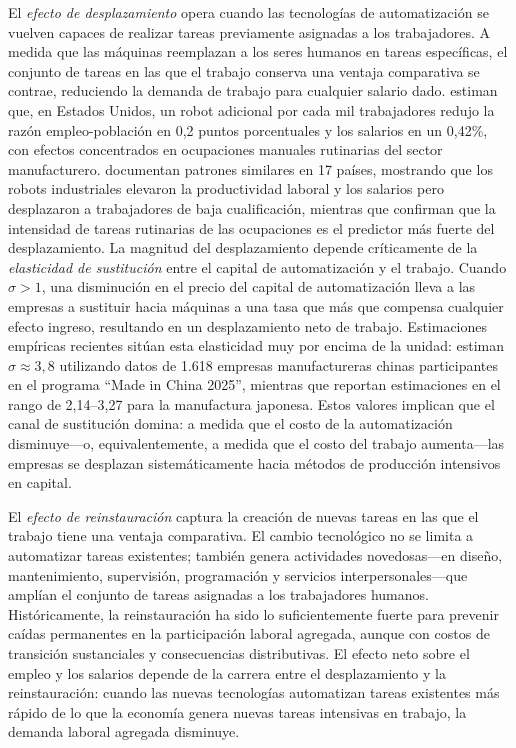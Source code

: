 \documentclass{article}
\begin{document}
El \textit{efecto de desplazamiento} opera cuando las tecnolog\'ias de automatizaci\'on se vuelven capaces de realizar tareas previamente asignadas a los trabajadores. A medida que las m\'aquinas reemplazan a los seres humanos en tareas espec\'ificas, el conjunto de tareas en las que el trabajo conserva una ventaja comparativa se contrae, reduciendo la demanda de trabajo para cualquier salario dado. \cite{acemoglu2020robots} estiman que, en Estados Unidos, un robot adicional por cada mil trabajadores redujo la raz\'on empleo-poblaci\'on en 0,2 puntos porcentuales y los salarios en un 0,42\%, con efectos concentrados en ocupaciones manuales rutinarias del sector manufacturero. \cite{graetz2018} documentan patrones similares en 17 pa\'ises, mostrando que los robots industriales elevaron la productividad laboral y los salarios pero desplazaron a trabajadores de baja cualificaci\'on, mientras que \cite{de2022} confirman que la intensidad de tareas rutinarias de las ocupaciones es el predictor m\'as fuerte del desplazamiento. La magnitud del desplazamiento depende cr\'iticamente de la \textit{elasticidad de sustituci\'on} entre el capital de automatizaci\'on y el trabajo. Cuando $\sigma > 1$, una disminuci\'on en el precio del capital de automatizaci\'on lleva a las empresas a sustituir hacia m\'aquinas a una tasa que m\'as que compensa cualquier efecto ingreso, resultando en un desplazamiento neto de trabajo. Estimaciones emp\'iricas recientes sit\'uan esta elasticidad muy por encima de la unidad: \cite{cheng2021elasticity} estiman $\sigma \approx 3,8$ utilizando datos de 1.618 empresas manufactureras chinas participantes en el programa ``Made in China 2025'', mientras que \cite{adachi2022} reportan estimaciones en el rango de 2,14--3,27 para la manufactura japonesa. Estos valores implican que el canal de sustituci\'on domina: a medida que el costo de la automatizaci\'on disminuye---o, equivalentemente, a medida que el costo del trabajo aumenta---las empresas se desplazan sistem\'aticamente hacia m\'etodos de producci\'on intensivos en capital.

El \textit{efecto de reinstauraci\'on} captura la creaci\'on de nuevas tareas en las que el trabajo tiene una ventaja comparativa. El cambio tecnol\'ogico no se limita a automatizar tareas existentes; tambi\'en genera actividades novedosas---en dise\~no, mantenimiento, supervisi\'on, programaci\'on y servicios interpersonales---que ampl\'ian el conjunto de tareas asignadas a los trabajadores humanos. Hist\'oricamente, la reinstauraci\'on ha sido lo suficientemente fuerte para prevenir ca\'idas permanentes en la participaci\'on laboral agregada, aunque con costos de transici\'on sustanciales y consecuencias distributivas. El efecto neto sobre el empleo y los salarios depende de la carrera entre el desplazamiento y la reinstauraci\'on: cuando las nuevas tecnolog\'ias automatizan tareas existentes m\'as r\'apido de lo que la econom\'ia genera nuevas tareas intensivas en trabajo, la demanda laboral agregada disminuye.
\end{document}
